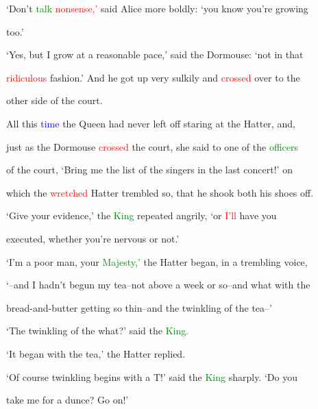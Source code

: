  ‘Don’t \textcolor{green}{talk} \textcolor{red}{nonsense,’} said Alice more boldly: ‘you know you’re \textcolor{BurntOrange}{growing}

 too.’



 ‘Yes, but I \textcolor{BurntOrange}{grow} at a reasonable pace,’ said the Dormouse: ‘not in that

 \textcolor{red}{ridiculous} fashion.’ And he got up very sulkily and \textcolor{red}{crossed} over to the

 other side of the \textcolor{BurntOrange}{court.}



 All this \textcolor{blue}{time} the Queen had never left off \textcolor{BurntOrange}{staring} at the Hatter, and,

 just as the Dormouse \textcolor{red}{crossed} the \textcolor{BurntOrange}{court,} she said to one of the \textcolor{green}{officers}

 of the \textcolor{BurntOrange}{court,} ‘Bring me the list of the singers in the last concert!’ on

 which the \textcolor{red}{wretched} Hatter trembled so, that he shook both his shoes off.



 ‘Give your evidence,’ the \textcolor{green}{King} repeated angrily, ‘or \textcolor{red}{I’ll} have you

 executed, whether you’re \textcolor{BurntOrange}{nervous} or not.’



 ‘I’m a poor man, your \textcolor{green}{Majesty,’} the Hatter began, in a trembling voice,

 ‘--and I hadn’t begun my tea--not above a week or so--and what with the

 bread-and-butter getting so thin--and the \textcolor{BurntOrange}{twinkling} of the tea--’



 ‘The \textcolor{BurntOrange}{twinkling} of the what?’ said the \textcolor{green}{King.}



 ‘It began with the tea,’ the Hatter replied.



 ‘Of course \textcolor{BurntOrange}{twinkling} begins with a T!’ said the \textcolor{green}{King} sharply. ‘Do you

 take me for a dunce? Go on!’




